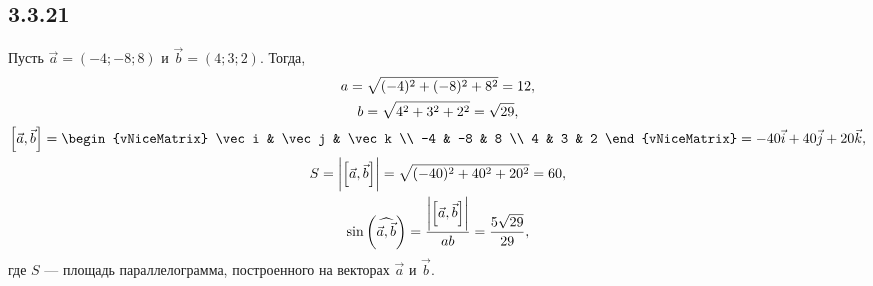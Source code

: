 \subsection{3.3.21}

Пусть $\vec a=(-4;-8;8)$ и $\vec b=(4;3;2)$. Тогда,
\begin{gather*}
a=\sqrt{(-4)^2+(-8)^2+8^2}=12, \\
b=\sqrt{4^2+3^2+2^2}=\sqrt{29}, \\
\left[\vec a,\vec b\right]=
\begin{vNiceMatrix}
	\vec i & \vec j & \vec k \\
	-4 & -8 & 8 \\
	4 & 3 & 2
\end{vNiceMatrix}
=-40\vec i+40\vec j+20\vec k, \\
S=\biggl|\left[\vec a,\vec b\right]\biggr|=\sqrt{(-40)^2+40^2+20^2}=60, \\
\sin\left(\widehat{\vec a,\vec b}\right)=\frac{\biggl|\left[\vec a,\vec b\right]\biggr|}{ab}=\frac{5\sqrt{29}}{29},
\end{gather*}
где $S$ --- площадь параллелограмма, построенного на векторах $\vec a$ и $\vec b$.